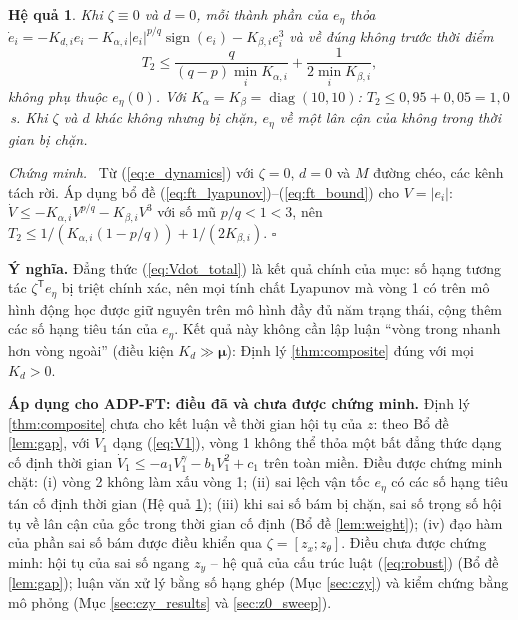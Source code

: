 \documentclass[12pt,a4paper]{article}
\newtheorem{hequa}{Hệ quả}
\newenvironment{chungminh}{\par\noindent\textit{Chứng minh.}\ }{\hfill$\square$\par\medskip}
\newcommand{\T}{\mathsf{T}}
\DeclareMathOperator{\diag}{diag}
\DeclareMathOperator{\sign}{sign}
\begin{document}
\begin{hequa}\label{cor:step2_ft}
Khi $\zeta \equiv 0$ và $d = 0$, mỗi thành phần của $e_\eta$ thỏa $\dot e_i = -K_{d,i}e_i - K_{\alpha,i}|e_i|^{p/q}\sign(e_i) - K_{\beta,i}e_i^3$ và về đúng không trước thời điểm
\begin{equation}\label{eq:T2}
    T_2 \leq \frac{q}{(q-p)\min_i K_{\alpha,i}} + \frac{1}{2\min_i K_{\beta,i}},
\end{equation}
không phụ thuộc $e_\eta(0)$. Với $K_\alpha = K_\beta = \diag(10, 10)$: $T_2 \leq 0{,}95 + 0{,}05 = 1{,}0$\,s. Khi $\zeta$ và $d$ khác không nhưng bị chặn, $e_\eta$ về một lân cận của không trong thời gian bị chặn.
\end{hequa}

\begin{chungminh}
Từ (\ref{eq:e_dynamics}) với $\zeta = 0$, $d = 0$ và $M$ đường chéo, các kênh tách rời. Áp dụng bổ đề (\ref{eq:ft_lyapunov})--(\ref{eq:ft_bound}) cho $V = |e_i|$: $\dot V \leq -K_{\alpha,i}V^{p/q} - K_{\beta,i}V^3$ với số mũ $p/q < 1 < 3$, nên $T_2 \leq 1/(K_{\alpha,i}(1 - p/q)) + 1/(2K_{\beta,i})$.
\end{chungminh}

\textbf{Ý nghĩa.} Đẳng thức (\ref{eq:Vdot_total}) là kết quả chính của mục: số hạng tương tác $\zeta^\T e_\eta$ bị triệt chính xác, nên mọi tính chất Lyapunov mà vòng 1 có trên mô hình động học được giữ nguyên trên mô hình đầy đủ năm trạng thái, cộng thêm các số hạng tiêu tán của $e_\eta$. Kết quả này không cần lập luận ``vòng trong nhanh hơn vòng ngoài'' (điều kiện $K_d \gg \bm\mu$): Định lý \ref{thm:composite} đúng với mọi $K_d > 0$.

\textbf{Áp dụng cho ADP-FT: điều đã và chưa được chứng minh.} Định lý \ref{thm:composite} chưa cho kết luận về thời gian hội tụ của $z$: theo Bổ đề \ref{lem:gap}, với $V_1$ dạng (\ref{eq:V1}), vòng 1 không thể thỏa một bất đẳng thức dạng cố định thời gian $\dot V_1 \leq -a_1V_1^\gamma - b_1V_1^2 + c_1$ trên toàn miền. Điều được chứng minh chặt: (i) vòng 2 không làm xấu vòng 1; (ii) sai lệch vận tốc $e_\eta$ có các số hạng tiêu tán cố định thời gian (Hệ quả \ref{cor:step2_ft}); (iii) khi sai số bám bị chặn, sai số trọng số hội tụ về lân cận của gốc trong thời gian cố định (Bổ đề \ref{lem:weight}); (iv) đạo hàm của phần sai số bám được điều khiển qua $\zeta = [z_x; z_\theta]$. Điều chưa được chứng minh: hội tụ của sai số ngang $z_y$ -- hệ quả của cấu trúc luật (\ref{eq:robust}) (Bổ đề \ref{lem:gap}); luận văn xử lý bằng số hạng ghép (Mục \ref{sec:czy}) và kiểm chứng bằng mô phỏng (Mục \ref{sec:czy_results} và \ref{sec:z0_sweep}).
\end{document}
